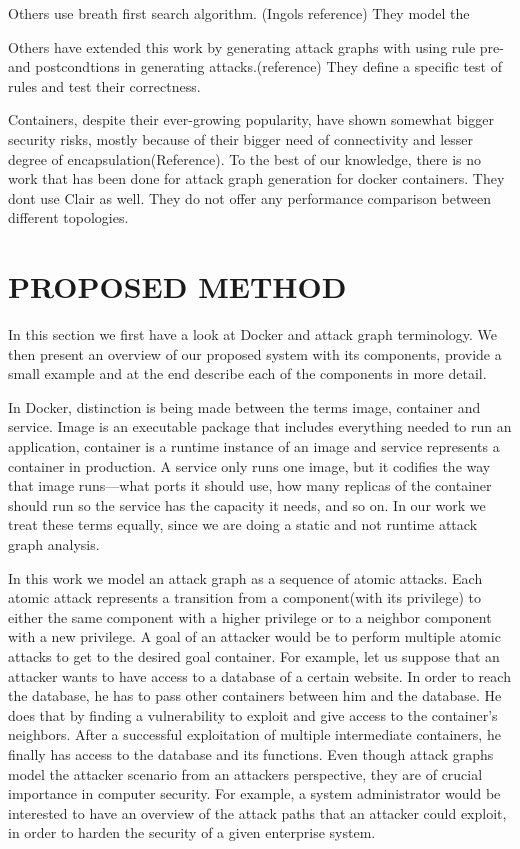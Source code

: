 \documentclass[letterpaper, 10 pt, conference]{ieeeconf}  %
\begin{document}
Others use breath first search algorithm. (Ingols reference)  They model the 

Others have extended this work by generating attack graphs with using rule pre- and postcondtions in generating attacks.(reference) They define a specific test of rules and test their correctness.

Containers, despite their ever-growing popularity, have shown somewhat bigger security risks, mostly because of their bigger need of connectivity and lesser degree of encapsulation(Reference). To the best of our knowledge, there is no work that has been done for attack graph generation for docker containers.
 They dont use Clair as well. They do not offer any performance comparison between different topologies. 

\section{PROPOSED METHOD}


In this section we first have a look at Docker and attack graph terminology. We then present an overview of our proposed system with its components, provide a small example and at the end describe each of the components in more detail. 

In Docker, distinction is being made between the terms image, container and service. Image is an executable package that includes everything needed to run an application,  container is a runtime instance of an image and service represents a container in production. A service only runs one image, but it codifies the way that image runs—what ports it should use, how many replicas of the container should run so the service has the capacity it needs, and so on. In our work we treat these terms equally, since we are doing a static and not runtime attack graph analysis.

In this work we model an attack graph as a sequence of atomic attacks. Each atomic attack represents a transition from a component(with its privilege) to either the same component with a higher privilege or to a neighbor component with a new privilege. A goal of an attacker would be to perform multiple atomic attacks to get to the desired goal container. For example, let us suppose that an attacker wants to have access to a database of a certain website. In order to reach the database, he has to pass other containers between him and the database. He does that by finding a vulnerability to exploit and give access to the container's neighbors. After a successful exploitation of multiple intermediate containers, he finally has access to the database and its functions. Even though attack graphs model the attacker scenario from an attackers perspective, they are of crucial importance in computer security. For example, a system administrator would be interested to have an overview of the attack paths that an attacker could exploit, in order to harden the security of a given enterprise system.
\end{document}
